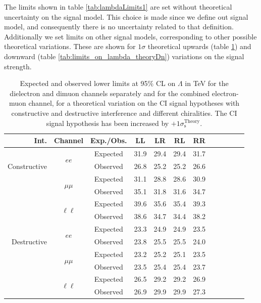 The limits shown in table \ref{tab:lambdaLimits1} are set without theoretical uncertainty on the signal model. This choice is made since we define out signal model, and consequently there is no uncertainty related to that definition. Additionally we set limits on other signal models, corresponding to other possible theoretical variations. These are shown for $1\sigma$ theoretical upwards (table \ref{tab:limits_on_lambda_theoryUp}) and downward (table \ref{tab:limits_on_lambda_theoryDn}) variations on the signal strength.

\begin{table}[htp]
\begin{center}
\caption{Expected and observed lower limits at 95$\%$ CL on $\Lambda$ in TeV for the dielectron and dimuon channels separately
and for the combined electron-muon channel, for a theoretical variation on the CI signal hypotheses with constructive
and destructive interference and different chiralities.
The CI signal hypothesis has been increased by $+1\sigma_\text{s}^\text{Theory}$.}
{\begin{tabular}{r c c c c c c c c c c c}\toprule
Int. & Channel & Exp./Obs. & LL & LR & RL & RR \\
\midrule
\multirow{3}{*}[-1.5em]{\begin{sideways}Constructive\end{sideways}} & \multirow{2}{*}{$ee$} & Expected & 31.9 & 29.4 & 29.4 & 31.7 \\
& & Observed & 26.8 & 25.2 & 25.2 & 26.6 \\
\cmidrule{2-7}
 & \multirow{2}{*}{$\mu\mu$} & Expected & 31.1 & 28.8 & 28.6 & 30.9 \\
& & Observed & 35.1 & 31.8 & 31.6 & 34.7 \\
\cmidrule{2-7}
 & \multirow{2}{*}{$\ell\ell$} & Expected & 39.6 & 35.6 & 35.4 & 39.3 \\
& & Observed & 38.6 & 34.7 & 34.4 & 38.2 \\
\midrule
\multirow{3}{*}[-1.5em]{\begin{sideways}Destructive\end{sideways}} & \multirow{2}{*}{$ee$} & Expected & 23.3 & 24.9 & 24.9 & 23.5 \\
& & Observed & 23.8 & 25.5 & 25.5 & 24.0 \\
\cmidrule{2-7}
 & \multirow{2}{*}{$\mu\mu$} & Expected & 23.2 & 25.2 & 25.1 & 23.5 \\
& & Observed & 23.5 & 25.4 & 25.4 & 23.7 \\
\cmidrule{2-7}
 & \multirow{2}{*}{$\ell\ell$} & Expected & 26.5 & 29.2 & 29.2 & 26.9 \\
& & Observed & 26.9 & 29.9 & 29.9 & 27.3 \\
\bottomrule\end{tabular}}\\
\label{tab:limits_on_lambda_theoryUp}
\end{center}
\end{table}

